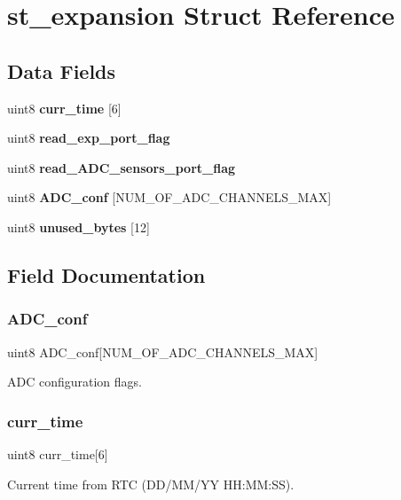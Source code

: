 \section{st\+\_\+expansion Struct Reference}
\label{structst__expansion}
\subsection*{Data Fields}
\begin{DoxyCompactItemize}
\item 
uint8 \textbf{ curr\+\_\+time} [6]
\item 
uint8 \textbf{ read\+\_\+exp\+\_\+port\+\_\+flag}
\item 
uint8 \textbf{ read\+\_\+\+A\+D\+C\+\_\+sensors\+\_\+port\+\_\+flag}
\item 
uint8 \textbf{ A\+D\+C\+\_\+conf} [N\+U\+M\+\_\+\+O\+F\+\_\+\+A\+D\+C\+\_\+\+C\+H\+A\+N\+N\+E\+L\+S\+\_\+\+M\+AX]
\item 
uint8 \textbf{ unused\+\_\+bytes} [12]
\end{DoxyCompactItemize}


\subsection{Field Documentation}
\mbox{\label{structst__expansion_ae9f8f466e488103ced67140d2d14216d}} 
\subsubsection{A\+D\+C\+\_\+conf}
{\footnotesize\ttfamily uint8 A\+D\+C\+\_\+conf[N\+U\+M\+\_\+\+O\+F\+\_\+\+A\+D\+C\+\_\+\+C\+H\+A\+N\+N\+E\+L\+S\+\_\+\+M\+AX]}

A\+DC configuration flags. \mbox{\label{structst__expansion_aa7a2bcba81fd34156b7cb457ef4776dc}} 
\subsubsection{curr\+\_\+time}
{\footnotesize\ttfamily uint8 curr\+\_\+time[6]}

Current time from R\+TC (D\+D/\+M\+M/\+YY H\+H\+:\+MM\+:SS). \mbox{\label{structst__expansion_a35f3f96b2d425fc3934ee6cfa8166a04}} 
